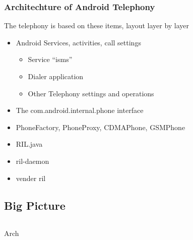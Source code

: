 \documentclass{beamer}
\begin{document}
\begin{frame}
    \frametitle{Architechture of Android Telephony}
    The telephony is based on these items, layout layer by layer \\
    \begin{itemize}
        \item Android Services, activities, call settings
            \begin{itemize}
                \item Service ``isms''
                \item Dialer application
                \item Other Telephony settings and operations
            \end{itemize}
        \item The com.android.internal.phone interface
        \item PhoneFactory, PhoneProxy, CDMAPhone, GSMPhone
        \item RIL.java
        \item ril-daemon
        \item vender ril
    \end{itemize}
\end{frame}

\subsection{Big Picture}
\begin{frame}
	\begin{columns}[c]
        \column{0.5in}
        Arch
        \column{3in}
    \end{columns}
\end{frame}
\end{document}
